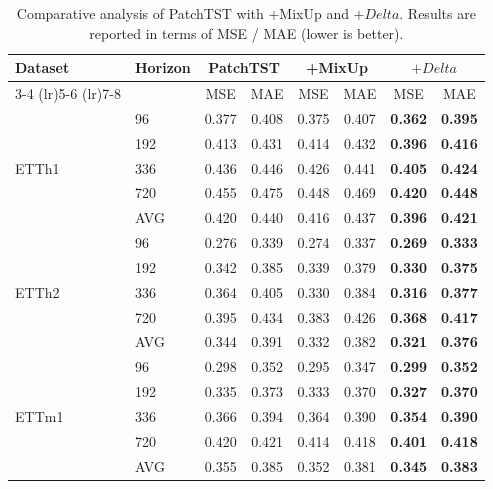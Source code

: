 \begin{table}[t]
  \caption{Comparative analysis of PatchTST with +MixUp and $+Delta$. Results are reported in terms of MSE / MAE (lower is better).}
  \label{tab:mixup_vs_DeltaTSFfull}
  \begin{center}
    \begin{small}
      \begin{sc}
        \begin{tabular}{llcccccc}
          \toprule
          Dataset & Horizon 
          & \multicolumn{2}{c}{PatchTST} 
          & \multicolumn{2}{c}{+MixUp} 
          & \multicolumn{2}{c}{$+Delta$} \\
          \cmidrule(lr){3-4} \cmidrule(lr){5-6} \cmidrule(lr){7-8}
          & & MSE & MAE & MSE & MAE & MSE & MAE \\
          \midrule
          \multirow{5}{*}{ETTh1}
          & 96  & 0.377 & 0.408 & 0.375 & 0.407 & \textbf{0.362} & \textbf{0.395} \\
          & 192 & 0.413 & 0.431 & 0.414 & 0.432 & \textbf{0.396} & \textbf{0.416} \\
          & 336 & 0.436 & 0.446 & 0.426 & 0.441 & \textbf{0.405} & \textbf{0.424} \\
          & 720 & 0.455 & 0.475 & 0.448 & 0.469 & \textbf{0.420} & \textbf{0.448} \\
          & AVG & 0.420 & 0.440 & 0.416 & 0.437 & \textbf{0.396} & \textbf{0.421} \\
          \midrule
          \multirow{5}{*}{ETTh2}
          & 96  & 0.276 & 0.339 & 0.274 & 0.337 & \textbf{0.269} & \textbf{0.333} \\
          & 192 & 0.342 & 0.385 & 0.339 & 0.379 & \textbf{0.330} & \textbf{0.375} \\
          & 336 & 0.364 & 0.405 & 0.330 & 0.384 & \textbf{0.316} & \textbf{0.377} \\
          & 720 & 0.395 & 0.434 & 0.383 & 0.426 & \textbf{0.368} & \textbf{0.417} \\
          & AVG & 0.344 & 0.391 & 0.332 & 0.382 & \textbf{0.321} & \textbf{0.376} \\
          \midrule
          \multirow{5}{*}{ETTm1}
          & 96  & 0.298 & 0.352 & 0.295 & 0.347 & \textbf{0.299} & \textbf{0.352} \\
          & 192 & 0.335 & 0.373 & 0.333 & 0.370 & \textbf{0.327} & \textbf{0.370} \\
          & 336 & 0.366 & 0.394 & 0.364 & 0.390 & \textbf{0.354} & \textbf{0.390} \\
          & 720 & 0.420 & 0.421 & 0.414 & 0.418 & \textbf{0.401} & \textbf{0.418} \\
          & AVG & 0.355 & 0.385 & 0.352 & 0.381 & \textbf{0.345} & \textbf{0.383} \\
          \bottomrule
        \end{tabular}
      \end{sc}
    \end{small}
  \end{center}
  \vskip -0.1in
\end{table}
